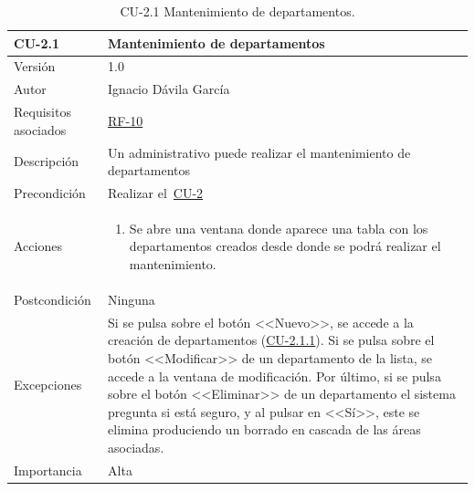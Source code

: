 \begin{table}[p]
	\centering
	\begin{tabularx}{\linewidth}{ p{} p{} }
		\toprule
		\textbf{CU-2.1}    & \textbf{Mantenimiento de departamentos}\\
		\toprule
		{\small Versión}              & 1.0    \\
		{\small Autor}                & Ignacio Dávila García \\
		{\small Requisitos asociados} & \hyperref[itm:RF10]{RF-10} \\
		{\small Descripción}          & Un administrativo puede realizar el mantenimiento de departamentos \\
		{\small Precondición}         & Realizar el~\hyperref[table:CU-2]{CU-2} \\
		{\small Acciones}             &
		\begin{enumerate}
			\def\labelenumi{\arabic{enumi}.}
			\tightlist
			\item Se abre una ventana donde aparece una tabla con los departamentos creados desde donde se podrá realizar el mantenimiento.
		\end{enumerate}\\
		{\small Postcondición}        & Ninguna \\
		{\small Excepciones}          & Si se pulsa sobre el botón <<Nuevo>>, se accede a la creación de departamentos (\hyperref[table:CU-2_1_1]{CU-2.1.1}). Si se pulsa sobre el botón <<Modificar>> de un departamento de la lista, se accede a la ventana de modificación. Por último, si se pulsa sobre el botón <<Eliminar>> de un departamento el sistema pregunta si está seguro, y al pulsar en <<Sí>>, este se elimina produciendo un borrado en cascada de las áreas asociadas. \\
		{\small Importancia}          & Alta \\
		\bottomrule
	\end{tabularx}
	\caption{CU-2.1 Mantenimiento de departamentos.}\label{table:CU-2_1}
\end{table}
\FloatBarrier

